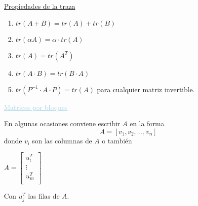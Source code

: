 \documentclass[12pt]{article}
\begin{document}
\underline{Propiedades de la traza}
\begin{enumerate}
    \item $tr(A+B)=tr(A)+tr(B)$
    \item $tr(\alpha A)=\alpha\cdot tr(A)$
    \item $tr(A)=tr(A^T)$
    \item $tr(A\cdot B)=tr(B\cdot A)$
\item $tr(P^{-1}\cdot A\cdot P)=tr(A)$ para cualquier matriz
invertible.
\end{enumerate}
\textcolor{lightblue}{\underline{Matrices por bloques}}


En algunas ocasiones conviene escribir $A$ en la forma
$$A=\left[v_1,v_2,\hdots,v_n\right]$$ donde $v_i$ son las
columnas de $A$ o también

$A=\begin{bmatrix}
    u_1^T\\
    \vdots \\
    u_m^T\\
\end{bmatrix}$

Con $u_j^T$ las filas de $A$.
\end{document}
